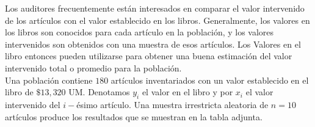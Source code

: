 \addpoints
\question[20] Los auditores frecuentemente están interesados en comparar el valor intervenido de los artículos con el valor establecido en los libros. Generalmente, los valores en los libros son conocidos para cada artículo en la población, y los valores intervenidos son obtenidos con una muestra de esos artículos. Los Valores en el libro entonces pueden utilizarse para obtener una buena estimación del valor intervenido total o promedio para la población.\\

Una población contiene $180$ artículos inventariados con un valor establecido en el libro de $\$13,320$ UM. Denotamos $y_i$ el valor en el libro y por $x_i$ el valor intervenido del $i-$ésimo artículo. Una muestra irrestricta aleatoria de $n=10$ artículos produce los resultados que se muestran en la tabla adjunta.


